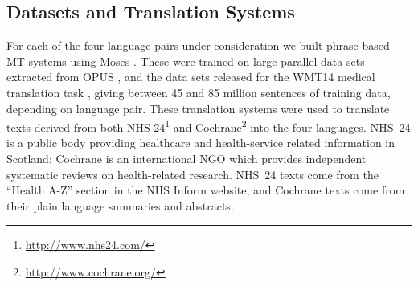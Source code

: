\documentclass[11pt,letterpaper]{article}
\newcommand{\oa}[1]{\footnote{\color{red}OA: #1}}
\newcommand{\bh}[1]{\footnote{\color{blue}BH: #1}}
\def\parcite#1{\cite{#1}}
\begin{document}




\subsection{Datasets and Translation Systems}

For each of the four language pairs under consideration  we built phrase-based MT systems
using Moses \parcite{Koehn:2007}.  These were trained on large parallel data sets extracted from
OPUS \parcite{tiedemann:2009}, and the data sets released for the WMT14
medical translation task \parcite{bojar-EtAl:2014:W14-33}, 
giving between 45 and 85 million sentences of training data, depending on language pair.
These translation systems were used to translate texts derived from both NHS
24\footnote{\url{http://www.nhs24.com/}} and
Cochrane\footnote{\url{http://www.cochrane.org/}} into the four languages.
NHS~24 is a public body providing healthcare and health-service
related information in Scotland; Cochrane is an international NGO
which provides independent systematic reviews on health-related research.
NHS~24 texts come from the ``Health A-Z'' section in the NHS Inform
website, and Cochrane texts come from their plain language summaries
and abstracts.

\end{document}
